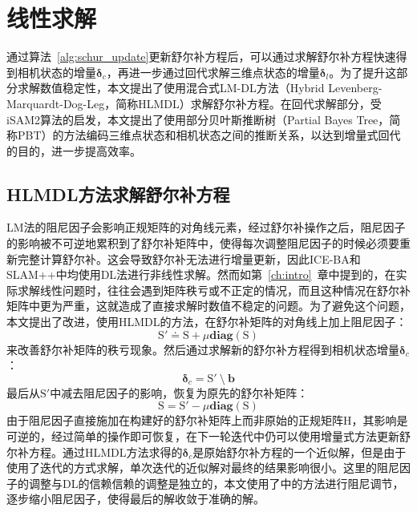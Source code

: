 \section{线性求解}\label{sec:lin_solver}

通过算法~\ref{alg:schur_update}更新舒尔补方程后，可以通过求解舒尔补方程快速得到相机状态的增量$\bm{\delta}_c$，再进一步通过回代求解三维点状态的增量$\bm{\delta}_l$。为了提升这部分求解数值稳定性，本文提出了使用混合式LM-DL方法（Hybrid Levenberg-Marquardt-Dog-Leg，简称HLMDL）求解舒尔补方程。在回代求解部分，受iSAM2\citep{kaess2012isam2}算法的启发，本文提出了使用部分贝叶斯推断树（Partial Bayes Tree，简称PBT）的方法编码三维点状态和相机状态之间的推断关系，以达到增量式回代的目的，进一步提高效率。

\subsection{HLMDL方法求解舒尔补方程}

LM法的阻尼因子会影响正规矩阵的对角线元素，经过舒尔补操作之后，阻尼因子的影响被不可逆地累积到了舒尔补矩阵中，使得每次调整阻尼因子的时候必须要重新完整计算舒尔补。这会导致舒尔补无法进行增量更新，因此ICE-BA\citep{liu2018ice}和SLAM++中均使用DL法进行非线性求解。然而如第~\ref{ch:intro}~章中提到的，在实际求解线性问题时，往往会遇到矩阵秩亏或不正定的情况，而且这种情况在舒尔补矩阵中更为严重，这就造成了直接求解时数值不稳定的问题。为了避免这个问题，本文提出了改进，使用HLMDL的方法，在舒尔补矩阵的对角线上加上阻尼因子：
\begin{equation}
    \mathrm{S}' \doteq \mathrm{S}+\mu\mathbf{diag}(\mathrm{S})
\end{equation}
来改善舒尔补矩阵的秩亏现象。然后通过求解新的舒尔补方程得到相机状态增量$\bm{\delta}_c$：
\begin{equation}
    \bm{\delta}_c = \mathrm{S}' \:\setminus\: \bm{b}
    \label{eq:hlmdl}
\end{equation}
最后从$\mathrm{S}'$中减去阻尼因子的影响，恢复为原先的舒尔补矩阵：
\begin{equation}
    \mathrm{S} = \mathrm{S}'-\mu\mathbf{diag}(\mathrm{S})
\end{equation}
由于阻尼因子直接施加在构建好的舒尔补矩阵上而非原始的正规矩阵$\mathrm{H}$，其影响是可逆的，经过简单的操作即可恢复，在下一轮迭代中仍可以使用增量式方法更新舒尔补方程。通过HLMDL方法求得的$\bm{\delta}_c$是原始舒尔补方程的一个近似解，但是由于使用了迭代的方式求解，单次迭代的近似解对最终的结果影响很小。这里的阻尼因子的调整与DL的信赖信赖的调整是独立的，本文使用了中的方法进行阻尼调节，逐步缩小阻尼因子，使得最后的解收敛于准确的解。

